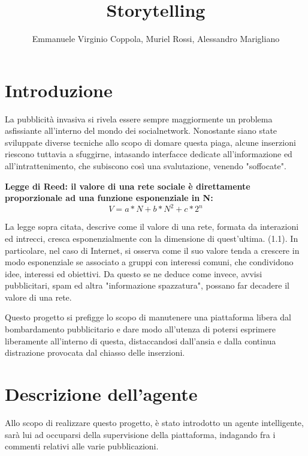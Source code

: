 \documentclass{report} %
\title{Storytelling} %
\author{Emmanuele Virginio Coppola, Muriel Rossi, Alessandro Marigliano} %
\begin{document}
    \maketitle %

    \tableofcontents
    \chapter{Introduzione} %
    
    La pubblicità invasiva si rivela essere sempre maggiormente un problema asfissiante all'interno del mondo dei socialnetwork. Nonostante siano state sviluppate diverse tecniche
    allo scopo di domare questa piaga, alcune inserzioni riescono tuttavia a sfuggirne, intasando interfacce dedicate all'informazione ed 
    all'intrattenimento, che subiscono così una svalutazione, venendo "soffocate".
    

    \textbf{Legge di Reed: il valore di una rete sociale è direttamente proporzionale ad una funzione esponenziale in N:}
    \begin{equation} %
        V=a*N+b*N^2 + c*2^n
        \end{equation}
    

    La legge sopra citata, descrive come il valore di una rete, formata da interazioni ed intrecci, cresca esponenzialmente con la dimensione di quest'ultima. (1.1).
    In particolare, nel caso di Internet, si osserva come il suo valore tenda a crescere in modo esponenziale se associato a gruppi con interessi
     comuni, che condividono idee, interessi ed obiettivi.
    Da questo se ne deduce come invece, avvisi pubblicitari, spam ed altra "informazione spazzatura", possano far decadere il valore di una rete.
    
    Questo progetto si prefigge lo scopo di manutenere una piattaforma libera dal bombardamento pubblicitario e dare modo all'utenza di potersi esprimere liberamente
    all'interno di questa, distaccandosi dall'ansia e dalla continua distrazione provocata dal chiasso delle inserzioni.
    \chapter{Descrizione dell'agente}
    Allo scopo di realizzare questo progetto, è stato introdotto un agente intelligente, sarà lui ad occuparsi della supervisione della piattaforma, indagando fra i 
    commenti relativi alle varie pubblicazioni.
\end{document}
